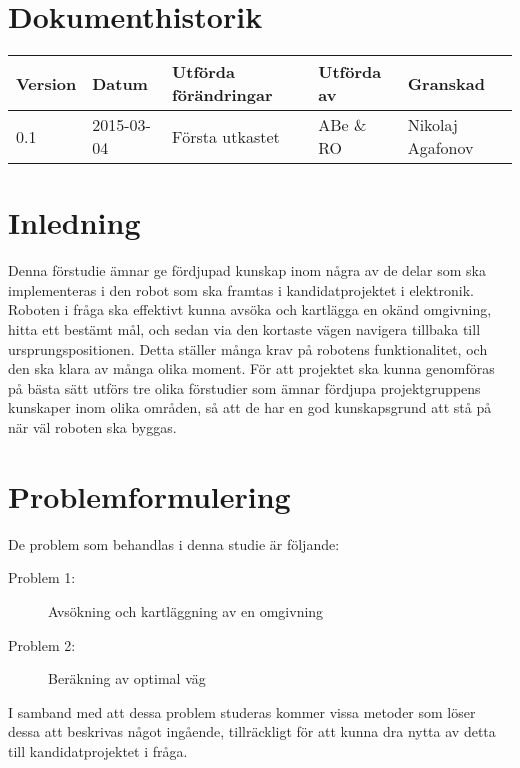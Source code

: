 \documentclass[12pt]{article}
\begin{document}
	\pagebreak
	
	\setcounter{secnumdepth}{3} %
	
	\tableofcontents	%
	
	\pagebreak
	
	\section*{Dokumenthistorik}
	\begin{table}[h]
		\begin{tabular}{|l|l|l|l|l|} \hline
			
			Version & 
			Datum & 
			Utförda förändringar & 
			Utförda av & 
			Granskad \\[0.1in] \hline
			
			0.1 &
			2015-03-04 &
			Första utkastet &
			ABe \& RO &
			Nikolaj Agafonov \\ \hline
			
		\end{tabular}
	\end{table}
	
	
	\pagebreak
	
	
	\section{Inledning}
	Denna förstudie ämnar ge fördjupad kunskap inom några av de delar som ska implementeras i den robot som ska framtas i kandidatprojektet i elektronik. Roboten i fråga ska effektivt kunna avsöka och kartlägga en okänd omgivning, hitta ett bestämt mål, och sedan via den kortaste vägen navigera tillbaka till ursprungspositionen. Detta ställer många krav på robotens funktionalitet, och den ska klara av många olika moment. För att projektet ska kunna genomföras på bästa sätt utförs tre olika förstudier som ämnar fördjupa projektgruppens kunskaper inom olika områden, så att de har en god kunskapsgrund att stå på när väl roboten ska byggas.\\[0.1in]
	
	\section{Problemformulering}
	\label{sec:problemform}
	De problem som behandlas i denna studie är följande:
	\begin{description}
		\item[Problem 1:] Avsökning och kartläggning av en omgivning
		\item[Problem 2:] Beräkning av optimal väg
	\end{description}
	I samband med att dessa problem studeras kommer vissa metoder som löser dessa att beskrivas något ingående, tillräckligt för att kunna dra nytta av detta till kandidatprojektet i fråga.\\[0.1in]
	
\end{document}
